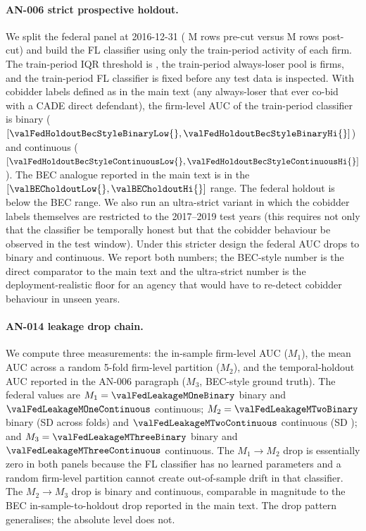 \paragraph{AN-006 \textemdash{} strict prospective holdout.}
We split the federal panel at 2016-12-31 (\valFedTrainRows{} M
rows pre-cut versus \valFedTestRows{} M rows post-cut) and build
the FL classifier using only the train-period activity of each
firm. The train-period IQR threshold is \valFedTrainThreshold{},
the train-period always-loser pool is \valFedTrainAL{} firms, and
the train-period FL classifier is fixed before any test data is
inspected. With cobidder labels defined as in the main text (any
always-loser that ever co-bid with a CADE direct defendant), the
firm-level AUC of the train-period classifier is
\valFedHoldoutBecStyleBinary{} binary
($[\valFedHoldoutBecStyleBinaryLow{}, \valFedHoldoutBecStyleBinaryHi{}]$)
and \valFedHoldoutBecStyleContinuous{} continuous
($[\valFedHoldoutBecStyleContinuousLow{}, \valFedHoldoutBecStyleContinuousHi{}]$).
The BEC analogue reported in the main text is in the
$[\valBECholdoutLow{}, \valBECholdoutHi{}]$ range. The federal
holdout is below the BEC range. We also run an ultra-strict
variant in which the cobidder labels themselves are restricted to
the 2017--2019 test years (this requires not only that the
classifier be temporally honest but that the cobidder behaviour
be observed in the test window). Under this stricter design the
federal AUC drops to \valFedHoldoutUltraStrictBinary{} binary and
\valFedHoldoutUltraStrictContinuous{} continuous. We report both
numbers; the BEC-style number is the direct comparator to the
main text and the ultra-strict number is the deployment-realistic
floor for an agency that would have to re-detect cobidder
behaviour in unseen years.

\paragraph{AN-014 \textemdash{} leakage drop chain.}
We compute three measurements: the in-sample firm-level AUC
($M_1$), the mean AUC across a random 5-fold firm-level partition
($M_2$), and the temporal-holdout AUC reported in the AN-006
paragraph ($M_3$, BEC-style ground truth). The federal values are
$M_1 = \valFedLeakageMOneBinary$ binary and
$\valFedLeakageMOneContinuous$ continuous; $M_2 =
\valFedLeakageMTwoBinary$ binary (SD \valFedLeakageMTwoBinarySD{}
across folds) and $\valFedLeakageMTwoContinuous$ continuous (SD
\valFedLeakageMTwoContinuousSD{}); and $M_3 =
\valFedLeakageMThreeBinary$ binary and $\valFedLeakageMThreeContinuous$
continuous. The $M_1 \to M_2$ drop is essentially zero in both
panels because the FL classifier has no learned parameters and a
random firm-level partition cannot create out-of-sample drift in
that classifier. The $M_2 \to M_3$ drop is
\valFedLeakageDropTwoThreeBinary{} binary and
\valFedLeakageDropTwoThreeContinuous{} continuous, comparable in
magnitude to the BEC in-sample-to-holdout drop reported in the
main text. The drop pattern generalises; the absolute level does
not.

